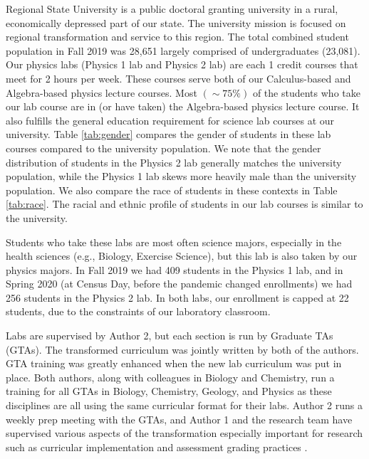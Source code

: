\documentclass[aip, numerical, preprint]{revtex4-2}
\begin{document}
Regional State University is a public doctoral granting university in a rural, economically
depressed part of our state.  The university mission is focused on regional transformation and
service to this region.  The total combined student population in Fall 2019 was 28,651 largely
comprised of undergraduates (23,081).  Our physics labs (Physics 1 lab and Physics 2 lab) are
each 1 credit courses that meet for 2 hours per week. These courses serve both of our
Calculus-based and Algebra-based physics lecture courses.  Most $(\sim 75\%)$ of the students
who take our lab course are in (or have taken) the Algebra-based physics lecture course. It
also fulfills the general education requirement for science lab courses at our university.
Table \ref{tab:gender} compares the gender of students in these lab courses compared to the
university population.  We note that the gender distribution of students in the Physics 2 lab
generally matches the university population, while the Physics 1 lab skews more heavily male
than the university population.  We also compare the race of students in these contexts in
Table \ref{tab:race}.  The racial and ethnic profile of students in our lab courses is similar
to the university.

Students who take these labs are most often science majors, especially in the health sciences
(e.g., Biology, Exercise Science), but this lab is also taken by our physics majors.  In Fall
2019 we had 409 students in the Physics 1 lab, and in Spring 2020 (at Census Day, before the
pandemic changed enrollments) we had 256 students in the Physics 2 lab.  In both labs, our
enrollment is capped at 22 students, due to the constraints of our laboratory classroom.

Labs are supervised by Author 2, but each section is run by Graduate TAs (GTAs). The
transformed curriculum was jointly written by both of the authors.  GTA training was greatly
enhanced when the new lab curriculum was put in place.  Both authors, along with colleagues in
Biology and Chemistry, run a training for all GTAs in Biology, Chemistry, Geology, and Physics
as these disciplines are all using the same curricular format for their labs.  Author 2 runs a
weekly prep meeting with the GTAs, and Author 1 and the research team have supervised various
aspects of the transformation especially important for research such as curricular
implementation \citep{SmithJoyner2020} and assessment grading practices \citep{Wolf2019mask}.
\end{document}
